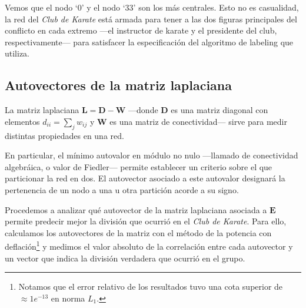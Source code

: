 \vspace{1em}
Vemos que el nodo `0' y el nodo `33' son los más centrales. Esto no es casualidad, la red del \textit{Club de Karate} está armada para tener a las dos figuras principales del conflicto en cada extremo ---el instructor de karate y el presidente del club, respectivamente--- para satisfacer la especificación del algoritmo de labeling que utiliza.





\vspace{2em}
\subsection{Autovectores de la matriz laplaciana} La matriz laplaciana $\mathbf{L} = \mathbf{D} - \mathbf{W}$ ---donde \textbf{D} es una matriz diagonal con elementos $d_{ii} = \sum_j w_{ij}$ y \textbf{W} es una matriz de conectividad--- sirve para medir distintas propiedades en una red. 

En particular, el mínimo autovalor en módulo no nulo ---llamado de conectividad algebráica, o valor de Fiedler--- permite establecer un criterio sobre el que particionar la red en dos. El autovector asociado a este autovalor designará la pertenencia de un nodo a una u otra partición acorde a su signo. 

\vspace{1em}
Procedemos a analizar qué autovector de la matriz laplaciana asociada a $\mathbf{E}$ permite predecir mejor la división que ocurrió en el \textit{Club de Karate}. Para ello, calculamos los autovectores de la matriz con el método de la potencia con deflación\footnote{Notamos que el error relativo de los resultados tuvo una cota superior de $\approx 1e^{-13}$ en norma $L_1$.} y medimos el valor absoluto de la correlación entre cada autovector y un vector que indica la división verdadera que ocurrió en el grupo.

